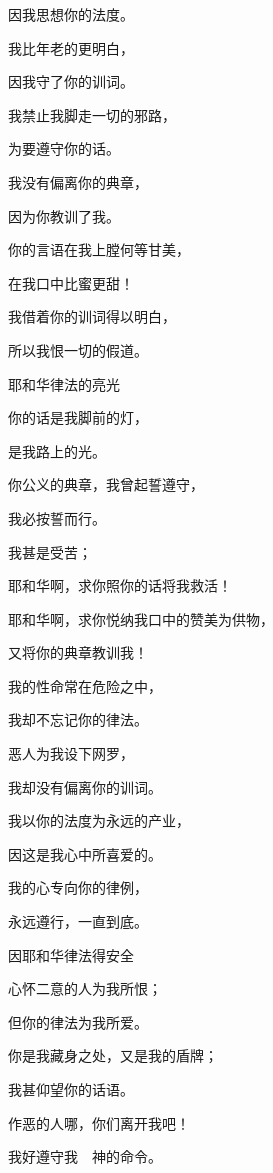 {\par }{\Q 因我思想你的法度。
\par }{\Q {}我比年老的更明白，
\par }{\Q 因我守了你的训词。
\par }{\Q {}我禁止我脚走一切的邪路，
\par }{\Q 为要遵守你的话。
\par }{\Q {}我没有偏离你的典章，
\par }{\Q 因为你教训了我。
\par }{\Q {}你的言语在我上膛何等甘美，
\par }{\Q 在我口中比蜜更甜！
\par }{\Q {}我借着你的训词得以明白，
\par }{\Q 所以我恨一切的假道。
\par }{\SH 耶和华律法的亮光
\par }{\Q {}你的话是我脚前的灯，
\par }{\Q 是我路上的光。
\par }{\Q {}你公义的典章，我曾起誓遵守，
\par }{\Q 我必按誓而行。
\par }{\Q {}我甚是受苦；
\par }{\Q 耶和华啊，求你照你的话将我救活！
\par }{\Q {}耶和华啊，求你悦纳我口中的赞美为供物，
\par }{\Q 又将你的典章教训我！
\par }{\Q {}我的性命常在危险之中，
\par }{\Q 我却不忘记你的律法。
\par }{\Q {}恶人为我设下网罗，
\par }{\Q 我却没有偏离你的训词。
\par }{\Q {}我以你的法度为永远的产业，
\par }{\Q 因这是我心中所喜爱的。
\par }{\Q {}我的心专向你的律例，
\par }{\Q 永远遵行，一直到底。
\par }{\SH 因耶和华律法得安全
\par }{\Q {}心怀二意的人为我所恨；
\par }{\Q 但你的律法为我所爱。
\par }{\Q {}你是我藏身之处，又是我的盾牌；
\par }{\Q 我甚仰望你的话语。
\par }{\Q {}作恶的人哪，你们离开我吧！
\par }{\Q 我好遵守我　神的命令。
}
